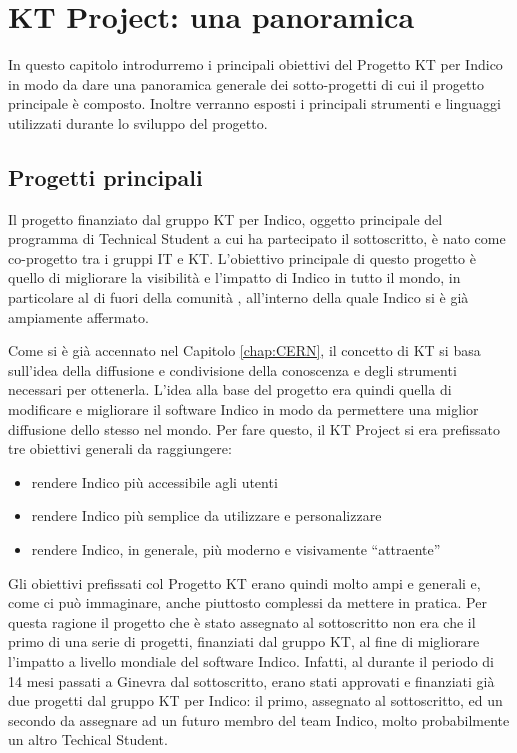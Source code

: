 \chapter{KT Project: una panoramica} \label{chap:panoramica}

	In questo capitolo introdurremo i principali obiettivi del Progetto KT per Indico in modo da dare una panoramica generale dei sotto-progetti di cui il progetto principale è composto. Inoltre verranno esposti i principali strumenti e linguaggi utilizzati durante lo sviluppo del progetto.
	
	\section{Progetti principali} \label{sec:p;progetti_principali}
    	
    	Il progetto finanziato dal gruppo \ac{KT} per Indico, oggetto principale del programma di Technical Student a cui ha partecipato il sottoscritto, è nato come co-progetto tra i gruppi \ac{IT} e \ac{KT}. L'obiettivo principale di questo progetto è quello di migliorare la visibilità e l'impatto di Indico in tutto il mondo, in particolare al di fuori della comunità , all'interno della quale Indico si è già ampiamente affermato.
    	
    	Come si è già accennato nel Capitolo \ref{chap:CERN}, il concetto di \ac{KT} si basa sull'idea della diffusione e condivisione della conoscenza e degli strumenti necessari per ottenerla. L'idea alla base del progetto era quindi quella di modificare e migliorare il software Indico in modo da permettere una miglior diffusione dello stesso nel mondo. Per fare questo, il KT Project si era prefissato tre obiettivi generali da raggiungere:
    	
    	\begin{itemize}
        	\item rendere Indico più accessibile agli utenti
        	\item rendere Indico più semplice da utilizzare e personalizzare
        	\item rendere Indico, in generale, più moderno e visivamente ``attraente''
    	\end{itemize}
    	
    	Gli obiettivi prefissati col Progetto KT erano quindi molto ampi e generali e, come ci può immaginare, anche piuttosto complessi da mettere in pratica. Per questa ragione il progetto che è stato assegnato al sottoscritto non era che il primo di una serie di progetti, finanziati dal gruppo \ac{KT}, al fine di migliorare l'impatto a livello mondiale del software Indico. Infatti, al durante il periodo di 14 mesi passati a Ginevra dal sottoscritto, erano stati approvati e finanziati già due progetti dal gruppo \ac{KT} per Indico: il primo, assegnato al sottoscritto, ed un secondo da assegnare ad un futuro membro del team Indico, molto probabilmente un altro Techical Student.
    	
